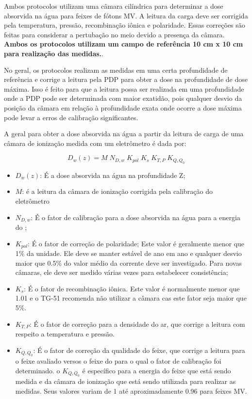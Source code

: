 \documentclass[11pt,a4paper]{article}
\newcounter{exemplo}
\begin{document}
    Ambos protocolos utilizam uma câmara cilíndrica para determinar a dose absorvida na água para feixes de fótons MV.  A leitura da carga deve ser corrigida pela temperatura, pressão, recombinação iônica e polaridade. Essas correções são feitas para considerar a pertubação no meio devido a presença da câmara. \textbf{\textcolor{CarnationPink}{Ambos os protocolos utilizam um campo de referência 10 cm x 10 cm para realização das medidas.}}.

    No geral, os protocolos realizam as medidas em uma certa profundidade de referência e corrige a leitura pela PDP para obter a dose na profundidade de dose máxima. Isso é feito para que a leitura possa ser realizada em uma profundidade onde a PDP pode ser determinada com maior exatidão, pois qualquer desvio da posição da câmara em relação à profundidade exata onde ocorre a dose máxima pode levar a erros de calibração significantes. 

    A  geral para obter a dose absorvida na água a partir da leitura de carga de uma câmara de ionização medida com um eletrômetro é dada por:

  		$$D_{w}(z) = M \; N_{D,w} \; K_{pol} \; K_s \; K_{T,P} \; K_{Q,Q_0}$$

	\begin{exemplo}[onde:]
		\begin{itemize}[label=\textcolor{CarnationPink}{$\star$}]
			\item \textbf{\textcolor{CarnationPink}{$D_{w}(z)$}}: É a dose absorvida na água na profundidade Z;
			\item \textbf{\textcolor{CarnationPink}{$M$}}: é a leitura da câmara de ionização corrigida pela calibração do eletrômetro
			\item \textbf{\textcolor{CarnationPink}{$N_{D,w}$}}: É o fator de calibração para a dose absorvida na água para a energia do ;
			\item \textbf{\textcolor{CarnationPink}{$K_{pol}$}}: É o fator de correção de polaridade; Este valor é geralmente menor que 1\% da unidade. Ele deve se manter estável de ano em ano e qualquer desvio maior que 0.5\% do valor médio da corrente deve ser investigado. Para novas câmaras, ele deve ser medido várias vezes para estabelecer consistência; 
			\item \textbf{\textcolor{CarnationPink}{$K_s$}}: É o fator de recombinação iônica. Este valor é normalmente menor que 1.01 e o TG-51 recomenda não utilizar a câmara cas este fator seja maior que 5\%. 
			\item \textbf{\textcolor{CarnationPink}{$K_{T,P}$}}: É o fator de correção para a densidade do ar, que corrige a leitura com respeito a temperatura e pressão. 
			\item \textbf{\textcolor{CarnationPink}{$K_{Q,Q_0}$}}: É o fator de correção da qualidade do feixe, que corrige a leitura para o feixe avaliado versos o feixe do  para o qual o fator de calibração foi determinado. o $K_{Q,Q_0}$ é específico para a energia do feixe que está sendo medida e da câmara de ionização que está sendo utilizada para realizar as medidas. Seus valores variam de 1 até aproximadamente 0.96 para feixes MV.
		\end{itemize}
	\end{exemplo}
\end{document}
